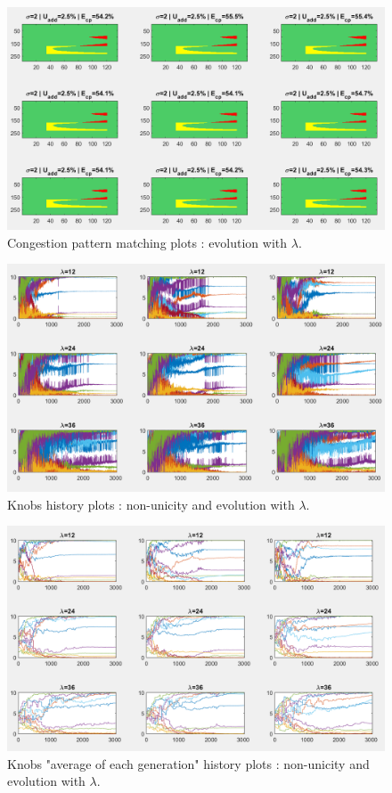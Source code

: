 \begin{figure}
	\label{fig:lambdacp}
	\caption{Congestion pattern matching plots : evolution with $\lambda$.}
	\includegraphics[width=7in]{figures/results_figures/lambda/cp_all.png}
\end{figure}
\begin{figure}
	\label{fig:lambdaknobs}
	\caption{Knobs history plots : non-unicity and evolution with $\lambda$.}
	\includegraphics[width=7in]{figures/results_figures/lambda/knobs_all.png}
\end{figure}
\begin{figure}
	\label{fig:lambdaknobsgenmean}
	\caption{Knobs "average of each generation" history plots : non-unicity and evolution with $\lambda$.}
	\includegraphics[width=7in]{figures/results_figures/lambda/knobs_all_genmean.png}
\end{figure}
